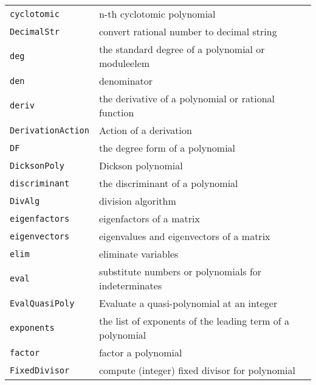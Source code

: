 \documentclass[a4paper]{mybook}
\begin{document}
\begin{center}
\begin{longtable}{ll}
{\verb~cyclotomic~} &
      n-th cyclotomic polynomial\\
   
{\verb~DecimalStr~} &
      convert rational number to decimal string\\
   
{\verb~deg~} &
      the standard degree of a polynomial or moduleelem\\
   
{\verb~den~} &
      denominator\\
   
{\verb~deriv~} &
      the derivative of a polynomial or rational function\\
   
{\verb~DerivationAction~} &
      Action of a derivation\\
   
{\verb~DF~} &
      the degree form of a polynomial\\
   
{\verb~DicksonPoly~} &
      Dickson polynomial\\
   
{\verb~discriminant~} &
      the discriminant of a polynomial\\
   
{\verb~DivAlg~} &
      division algorithm\\
   
{\verb~eigenfactors~} &
      eigenfactors of a matrix\\
   
{\verb~eigenvectors~} &
      eigenvalues and eigenvectors of a matrix\\
   
{\verb~elim~} &
      eliminate variables\\
   
{\verb~eval~} &
      substitute numbers or polynomials for indeterminates\\
   
{\verb~EvalQuasiPoly~} &
      Evaluate a quasi-polynomial at an integer\\
   
{\verb~exponents~} &
      the list of exponents of the leading term of a polynomial\\
   
{\verb~factor~} &
      factor a polynomial\\
   
{\verb~FixedDivisor~} &
      compute (integer) fixed divisor for polynomial\\
   

\end{longtable}
\end{center}
\end{document}
